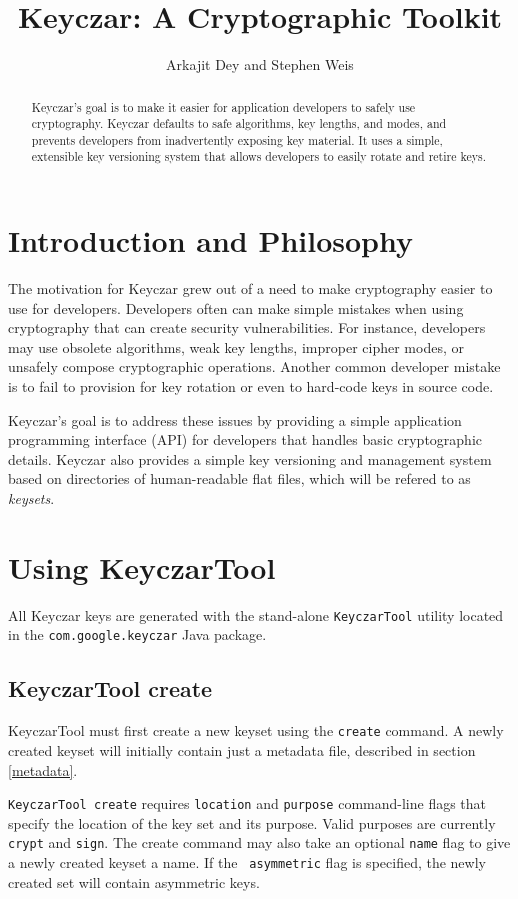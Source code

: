 \documentclass{llncs}
\title{Keyczar: A Cryptographic Toolkit}
\author{Arkajit Dey\inst{1} and Stephen Weis\inst{2}}
\institute{Massachusetts Institute of Technology, Cambridge, MA, USA 02139
\and
Google Inc., Mountain View, CA, USA 94043}
\begin{document}
\maketitle

\begin{abstract}
Keyczar's goal is to make it easier for application developers to safely use
cryptography. Keyczar defaults to safe algorithms, key lengths, and
modes, and prevents developers from inadvertently exposing key material. It
uses a simple, extensible key versioning system that allows developers to
easily rotate and retire keys. 
\end{abstract}

\section{Introduction and Philosophy}

The motivation for Keyczar grew out of a need to make cryptography easier to
use for developers. Developers often can make simple mistakes when using
cryptography that can create security vulnerabilities. For instance, developers
may use obsolete algorithms, weak key lengths, improper cipher modes, or
unsafely compose cryptographic operations. Another common developer mistake is
to fail to provision for key rotation or even to hard-code keys in source
code.

Keyczar's goal is to address these issues by providing a simple application
programming interface (API) for developers that handles basic cryptographic
details. Keyczar also provides a simple key versioning and management system
based on directories of human-readable flat files, which will be refered to as
\emph{keysets}. 
\section{Using KeyczarTool}\label{keytool}

All Keyczar keys are generated with the stand-alone
{\tt KeyczarTool} utility located in the {\tt com.google.keyczar} Java package.

\subsection{KeyczarTool create}
KeyczarTool must first create a new keyset using the {\tt create} command. A
newly created keyset will initially contain just a metadata file, described in
section \ref{metadata}.

{\tt KeyczarTool create} requires {\tt location} and {\tt purpose} command-line
flags that specify the location of the key set and its purpose. Valid purposes
are currently {\tt crypt} and {\tt sign}. The create command may also take
an optional {\tt name} flag to give a newly created keyset a name. If the {\tt
asymmetric} flag is specified, the newly created set will contain asymmetric
keys.
\end{document}

